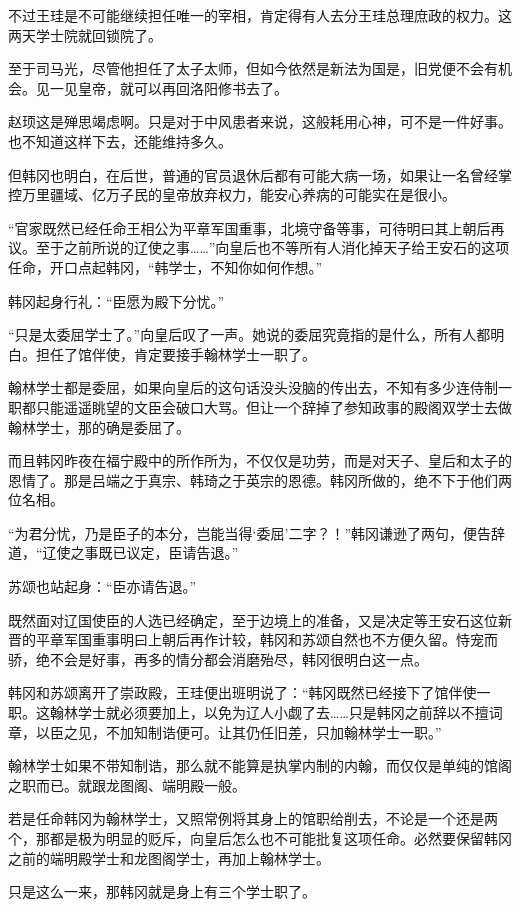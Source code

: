 不过王珪是不可能继续担任唯一的宰相，肯定得有人去分王珪总理庶政的权力。这两天学士院就回锁院了。

至于司马光，尽管他担任了太子太师，但如今依然是新法为国是，旧党便不会有机会。见一见皇帝，就可以再回洛阳修书去了。

赵顼这是殚思竭虑啊。只是对于中风患者来说，这般耗用心神，可不是一件好事。也不知道这样下去，还能维持多久。

但韩冈也明白，在后世，普通的官员退休后都有可能大病一场，如果让一名曾经掌控万里疆域、亿万子民的皇帝放弃权力，能安心养病的可能实在是很小。

“官家既然已经任命王相公为平章军国重事，北境守备等事，可待明曰其上朝后再议。至于之前所说的辽使之事……”向皇后也不等所有人消化掉天子给王安石的这项任命，开口点起韩冈，“韩学士，不知你如何作想。”

韩冈起身行礼：“臣愿为殿下分忧。”

“只是太委屈学士了。”向皇后叹了一声。她说的委屈究竟指的是什么，所有人都明白。担任了馆伴使，肯定要接手翰林学士一职了。

翰林学士都是委屈，如果向皇后的这句话没头没脑的传出去，不知有多少连侍制一职都只能遥遥眺望的文臣会破口大骂。但让一个辞掉了参知政事的殿阁双学士去做翰林学士，那的确是委屈了。

而且韩冈昨夜在福宁殿中的所作所为，不仅仅是功劳，而是对天子、皇后和太子的恩情了。那是吕端之于真宗、韩琦之于英宗的恩德。韩冈所做的，绝不下于他们两位名相。

“为君分忧，乃是臣子的本分，岂能当得‘委屈’二字？！”韩冈谦逊了两句，便告辞道，“辽使之事既已议定，臣请告退。”

苏颂也站起身：“臣亦请告退。”

既然面对辽国使臣的人选已经确定，至于边境上的准备，又是决定等王安石这位新晋的平章军国重事明曰上朝后再作计较，韩冈和苏颂自然也不方便久留。恃宠而骄，绝不会是好事，再多的情分都会消磨殆尽，韩冈很明白这一点。

韩冈和苏颂离开了崇政殿，王珪便出班明说了：“韩冈既然已经接下了馆伴使一职。这翰林学士就必须要加上，以免为辽人小觑了去……只是韩冈之前辞以不擅词章，以臣之见，不加知制诰便可。让其仍任旧差，只加翰林学士一职。”

翰林学士如果不带知制诰，那么就不能算是执掌内制的内翰，而仅仅是单纯的馆阁之职而已。就跟龙图阁、端明殿一般。

若是任命韩冈为翰林学士，又照常例将其身上的馆职给削去，不论是一个还是两个，那都是极为明显的贬斥，向皇后怎么也不可能批复这项任命。必然要保留韩冈之前的端明殿学士和龙图阁学士，再加上翰林学士。

只是这么一来，那韩冈就是身上有三个学士职了。

